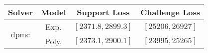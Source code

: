 \begin{tabular}{cc|c|c} 
\hline 
 Solver & Model & Support Loss  & Challenge Loss \tabularnewline\hline 
\hline 
\multirow{2}{*}{dpmc} & Exp. & $\left[2371.8,2899.3\right]$ & $\left[25206,26927\right]$ \tabularnewline 
 & Poly. & $\left[2373.1,2900.1\right]$ & $\left[23995,25265\right]$ \tabularnewline 
\hline 
\end{tabular} 

